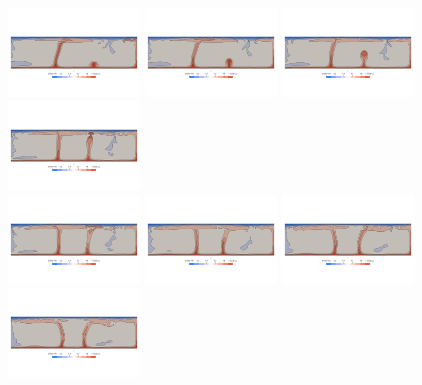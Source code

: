 \begin{center}
\includegraphics[width=3.5cm]{python_codes/fieldstone_88/results/model3/T0006.png}
\includegraphics[width=3.5cm]{python_codes/fieldstone_88/results/model3/T0007.png}
\includegraphics[width=3.5cm]{python_codes/fieldstone_88/results/model3/T0008.png}
\includegraphics[width=3.5cm]{python_codes/fieldstone_88/results/model3/T0009.png}\\
\includegraphics[width=3.5cm]{python_codes/fieldstone_88/results/model3/T0010.png}
\includegraphics[width=3.5cm]{python_codes/fieldstone_88/results/model3/T0011.png}
\includegraphics[width=3.5cm]{python_codes/fieldstone_88/results/model3/T0012.png}
\includegraphics[width=3.5cm]{python_codes/fieldstone_88/results/model3/T0013.png}

\end{center}
